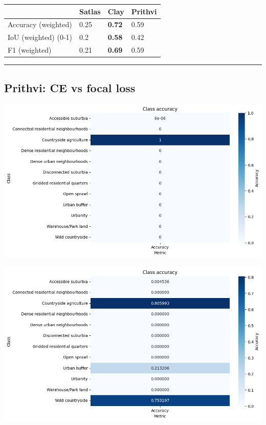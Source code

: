 \documentclass[
  letterpaper,
  DIV=11,
  numbers=noendperiod]{scrartcl}
\begin{document}
\begin{longtable}[]{@{}llll@{}}
\toprule\noalign{}
& Satlas & Clay & Prithvi \\
\midrule\noalign{}
\endhead
\bottomrule\noalign{}
\endlastfoot
Accuracy (weighted) & 0.25 & \textbf{0.72} & 0.59 \\
IoU (weighted) (0-1) & 0.2 & \textbf{0.58} & 0.42 \\
F1 (weighted) & 0.21 & \textbf{0.69} & 0.59 \\
\end{longtable}

\begin{center}\rule{0.5\linewidth}{0.5pt}\end{center}

\subsection{Prithvi: CE vs focal loss}\label{prithvi-ce-vs-focal-loss}

\begin{center}
\includegraphics[width=\textwidth,height=3.125in]{../figures/algo_design/class_acc_ce_loss.png}
\end{center}
\begin{center}
\includegraphics[width=\textwidth,height=3.125in]{../figures/algo_design/class_acc_focal_loss_prithvi.png}
\end{center}
\end{document}
